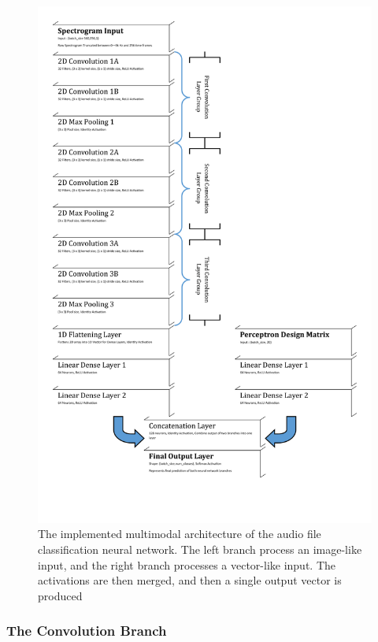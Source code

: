 \documentclass[12pt,letterpaper]{article}
\begin{document}
\begin{figure}[H]
\begin{center}
\includegraphics[scale=0.75]{../Figures/NeuralNetworkArchitecture}
\end{center}
\caption{The implemented multimodal architecture of the audio file classification neural network. The left branch process an image-like input, and the right branch processes a vector-like input. The activations are then merged, and then a single output vector is produced}
\label{fig-NetworkArchitecture}
\end{figure}




\subsubsection{The Convolution Branch}
\end{document}
